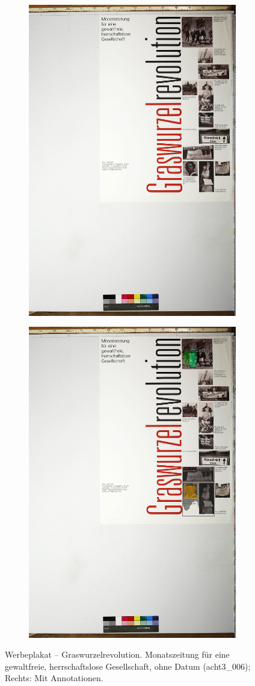 \documentclass[a4paper,12pt,ngerman]{article}
\begin{document}
\newpage
\begin{landscape}
\begin{figure}[ht]
	\begin{subfigure}[b]{0.5\linewidth}
	\centering
	\includegraphics[height=\linewidth]{Abbildung_41_(acht3_006)}
	\end{subfigure}
	\begin{subfigure}[b]{0.5\linewidth}
	\centering
	\includegraphics[height=\linewidth]{Abbildung_41_(acht3_006)_with_detections}
	\end{subfigure}
	\caption{Werbeplakat -- Graswurzelrevolution. Monatszeitung für eine gewaltfreie, herrschaftslose Gesellschaft, ohne Datum (acht3\_006); Rechts: Mit Annotationen.}
\end{figure}
\end{landscape}
\end{document}
